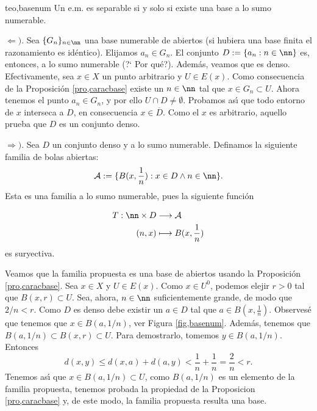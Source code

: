 \begin{teorema}{teo,basenum} Un e.m. es separable si y solo si existe una base
a lo sumo numerable.
\end{teorema}
\begin{demo}$\Leftarrow )$. Sea $\{G_n\}_{n\in\nn}$ una base numerable de
abiertos (si hubiera una base finita el razonamiento es
idéntico). Elijamos $a_n\in G_n$. El conjunto
$D:=\{a_n:n\in\nn\}$ es, entonces, a lo sumo numerable (?` Por
qué?). Además, veamos que es denso. Efectivamente, sea $x\in
X$ un punto arbitrario y $U\in E(x)$. Como consecuencia de la
Proposición \vref{pro,caracbase} existe un $n\in\nn$ tal que
$x\in G_n\subset U$. Ahora tenemos el punto $a_n\in G_n$, y por
ello $U\cap D\neq\emptyset$. Probamos as\'{\i} que todo entorno de
$x$ interseca a $D$, en consecuencia $x\in \overline{D}$. Como el
$x$ es arbitrario, aquello prueba que $D$ es un conjunto denso.


$\Rightarrow )$. Sea $D$ un conjunto denso y a lo sumo numerable.
Definamos la siguiente familia de bolas abiertas:
\[
   \mathcal{A}:= \{B(x,\frac1n):x\in D \wedge n\in\nn\}.
\]
Esta es una familia a lo sumo numerable, pues la siguiente
función

\begin{eqnarray}
    T:\nn\times D&\longrightarrow\mathcal{A}\nonumber \\
    (n,x)&\longmapsto B(x,\frac1n)\nonumber \\
\end{eqnarray}
es suryectiva.


Veamos que la familia propuesta es una base de abiertos usando la
Proposición \vref{pro,caracbase}. Sea $x\in X$ y $U\in E(x)$.
Como $x\in U^0$, podemos elejir $r>0$ tal que $B(x,r)\subset U$.
Sea, ahora, $n\in\nn$ suficientemente grande, de modo que $2/n<r$.
Como $D$ es denso debe existir un $a\in D$ tal que $a\in
B(x,\frac1n)$. Observesé que tenemos que $x\in B(a,1/n)$, ver
Figura \ref{fig,basenum}. Además, tenemos que $B(a,1/n)\subset
B(x,r)\subset U$. Para demostrarlo, tomemos $y\in B(a,1/n)$.
Entonces
\[
    d(x,y)\leq d(x,a)+d(a,y)<\frac1n+\frac1n=\frac2n<r.
\]
Tenemos as\'{\i} que $x\in B(a,1/n)\subset U$, como $B(a,1/n)$ es
un elemento de la familia propuesta, tenemos probada la propiedad
de la Proposicion \vref{pro,caracbase} y, de este modo, la familia
propuesta resulta una base.
\end{demo}

